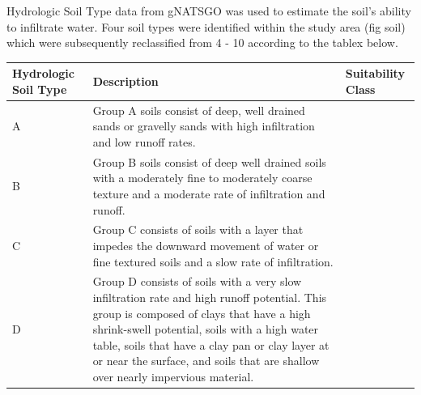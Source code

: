 \documentclass[
  number,
  preprint,
  3p,
  onecolumn]{elsarticle}
\begin{document}
Hydrologic Soil Type data from gNATSGO was used to estimate the soil's
ability to infiltrate water. Four soil types were identified within the
study area (fig soil) which were subsequently reclassified from 4 - 10
according to the tablex below.

\begin{longtable}[]{@{}
  >{\raggedright\arraybackslash}p{}
  >{\raggedright\arraybackslash}p{}
  >{\raggedright\arraybackslash}p{}@{}}
\toprule\noalign{}
\begin{minipage}[b]{\linewidth}\raggedright
Hydrologic Soil Type
\end{minipage} & \begin{minipage}[b]{\linewidth}\raggedright
Description
\end{minipage} & \begin{minipage}[b]{\linewidth}\raggedright
Suitability Class
\end{minipage} \\
\midrule\noalign{}
\endhead
\bottomrule\noalign{}
\endlastfoot
A & Group A soils consist of deep, well drained sands or gravelly sands
with high infiltration and low runoff rates. & 10 \\
B & Group B soils consist of deep well drained soils with a moderately
fine to moderately coarse texture and a moderate rate of infiltration
and runoff. & 8 \\
C & Group C consists of soils with a layer that impedes the downward
movement of water or fine textured soils and a slow rate of
infiltration. & 6 \\
D & Group D consists of soils with a very slow infiltration rate and
high runoff potential. This group is composed of clays that have a high
shrink-swell potential, soils with a high water table, soils that have a
clay pan or clay layer at or near the surface, and soils that are
shallow over nearly impervious material. & 4 \\
\end{longtable}
\end{document}
